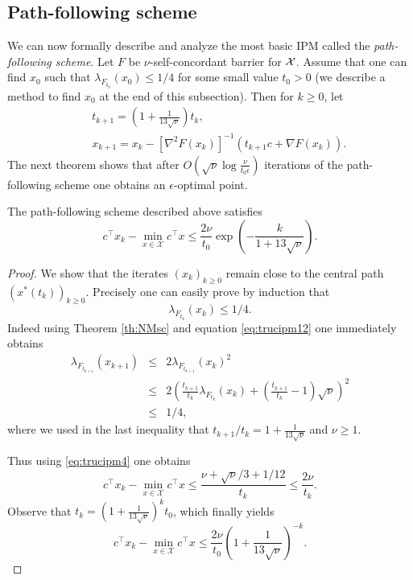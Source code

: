 \subsection{Path-following scheme}
We can now formally describe and analyze the most basic IPM called the {\em path-following scheme}. Let $F$ be $\nu$-self-concordant barrier for $\mathcal{X}$. Assume that one can find $x_0$ such that $\lambda_{F_{t_0}}(x_0) \leq 1/4$ for some small value $t_0 >0$ (we describe a method to find $x_0$ at the end of this subsection).
Then for $k \geq 0$, let
\begin{eqnarray*}
& & t_{k+1} = \left(1 + \frac1{13\sqrt{\nu}}\right) t_k ,\\
& & x_{k+1} = x_k - [\nabla^2 F(x_k)]^{-1} (t_{k+1} c + \nabla F(x_k) ) .
\end{eqnarray*}
The next theorem shows that after $O\left( \sqrt{\nu} \log \frac{\nu}{t_0 \epsilon} \right)$ iterations of the path-following scheme one obtains an $\epsilon$-optimal point.
\begin{theorem}
The path-following scheme described above satisfies
$$c^{\top} x_k - \min_{x \in \mathcal{X}} c^{\top} x \leq \frac{2 \nu}{t_0} \exp\left( - \frac{k}{1+13\sqrt{\nu}} \right) .$$
\end{theorem}
\begin{proof}
We show that the iterates $(x_k)_{k \geq 0}$ remain close to the central path $(x^*(t_k))_{k \geq 0}$. Precisely one can easily prove by induction that 
$$\lambda_{F_{t_k}}(x_k) \leq 1/4 .$$
Indeed using Theorem \ref{th:NMsc} and equation \eqref{eq:trucipm12} one immediately obtains
\begin{eqnarray*}
\lambda_{F_{t_{k+1}}}(x_{k+1}) & \leq & 2 \lambda_{F_{t_{k+1}}}(x_k)^2 \\
& \leq & 2 \left(\frac{t_{k+1}}{t_k} \lambda_{F_{t_k}}(x_k) + \left(\frac{t_{k+1}}{t_k} - 1\right) \sqrt{\nu}\right)^2  \\
& \leq & 1/4 ,
\end{eqnarray*}
where we used in the last inequality that $t_{k+1} / t_k = 1 + \frac1{13\sqrt{\nu}}$ and $\nu \geq 1$.

Thus using \eqref{eq:trucipm4} one obtains
$$c^{\top} x_k - \min_{x \in \mathcal{X}} c^{\top} x \leq \frac{\nu + \sqrt{\nu} / 3 + 1/12}{t_k} \leq \frac{2 \nu}{t_k} .$$
Observe that $t_{k} = \left(1 + \frac1{13\sqrt{\nu}}\right)^{k} t_0$, which finally yields
$$c^{\top} x_k - \min_{x \in \mathcal{X}} c^{\top} x \leq \frac{2 \nu}{t_0} \left(1 + \frac1{13\sqrt{\nu}}\right)^{- k}.$$
\end{proof}


